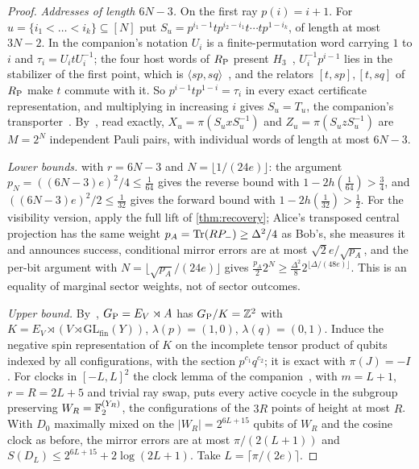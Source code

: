 \begin{proof}
\emph{Addresses of length $6N-3$.} On the first ray $p(i)=i+1$. For $u=\{i_1<\dots<i_k\}\subseteq[N]$ put
$S_u=p^{i_1-1}tp^{i_2-i_1}t\cdots tp^{1-i_k}$, of length at most $3N-2$. In the companion's notation $U_i$ is a finite-permutation word
carrying $1$ to $i$ and $\tau_i=U_itU_i^{-1}$; the four host words of $R_{\mathrm P}$ present $H_3$~\cite[Appendix~A]{DM-game}, $U_i^{-1}p^{i-1}$ lies in the stabilizer of
the first point, which is $\langle sp,sq\rangle$~\cite[Lemma~7.4]{DM-game}, and the relators $[t,sp],[t,sq]$ of $R_{\mathrm P}$ make $t$ commute with it.
So $p^{i-1}tp^{1-i}=\tau_i$ in every exact certificate representation, and multiplying in increasing $i$ gives $S_u=T_u$, the
companion's transporter~\cite[Definition~7.5]{DM-game}. By~\cite[Theorem~7.8 and Lemma~7.11]{DM-game}, read exactly, $X_u=\pi(S_uxS_u^{-1})$ and $Z_u=\pi(S_uzS_u^{-1})$ are
$M=2^N$ independent Pauli pairs, with individual words of length at most $6N-3$.

\emph{Lower bounds.}  with $r=6N-3$ and $N=\lfloor1/(24e)\rfloor$: the argument $p_N=((6N-3)e)^2/4\le\frac1{64}$ gives the
reverse bound with $1-2h(\frac1{64})>\frac34$, and $((6N-3)e)^2/2\le\frac1{32}$ gives the forward bound with $1-2h(\frac1{32})>\frac12$. For
the visibility version, apply the full lift of \cref{thm:recovery}; Alice's transposed central projection has the same weight
$p_A=\operatorname{Tr}(RP_-)\ge\Delta^2/4$ as Bob's, she measures it and announces success, conditional mirror errors are at most $\sqrt2e/\sqrt{p_A}$,
and the per-bit argument with $N=\lfloor\sqrt{p_A}/(24e)\rfloor$ gives $\frac{p_A}22^{N}\ge\frac{\Delta^2}82^{\lfloor\Delta/(48e)\rfloor}$. This is an equality
of marginal sector weights, not of sector outcomes.

\emph{Upper bound.} By~\cite[Proposition~6.8 and (5)]{DM-game}, $G_{\mathrm P}=E_V\rtimes A$ has $G_{\mathrm P}/K=\mathbb Z^2$ with $K=E_V\rtimes(V\rtimes\mathrm{GL}_{\mathrm{fin}}(Y))$,
$\lambda(p)=(1,0)$, $\lambda(q)=(0,1)$. Induce the negative spin representation of $K$ on the incomplete tensor product of qubits indexed by
all configurations, with the section $p^{c_1}q^{c_2}$; it is exact with $\pi(J)=-I$. For clocks in $[-L,L]^2$ the clock lemma of the
companion~\cite[Lemma~9.3]{DM-game}, with $m=L+1$, $r=R=2L+5$ and trivial ray swap, puts every active cocycle in the subgroup preserving
$W_R=\mathbb F_2^{(Y_R)}$, the configurations of the $3R$ points of height at most $R$. With $D_0$ maximally mixed on the $|W_R|=2^{6L+15}$
qubits of $W_R$ and the cosine clock as before, the mirror errors are at most $\pi/(2(L+1))$ and
$S(D_L)\le2^{6L+15}+2\log(2L+1)$. Take $L=\lceil\pi/(2e)\rceil$.
\end{proof}

